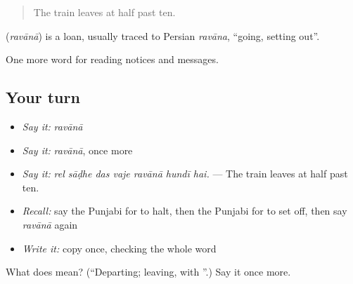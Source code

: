 \begin{quote}
The train leaves at half past ten.
\end{quote}

\begin{cousinweb}
\textbf{} (\emph{ravānā}) is a loan, usually traced to Persian \emph{ravāna}, \textquotedblleft{}going, setting out\textquotedblright{}.
\end{cousinweb}

\begin{grammarlens}[title={What you've built}]
One more word for reading notices and messages.
\end{grammarlens}

\subsection*{Your turn}
\begin{itemize}
\raggedright
  \item \emph{Say it:} \emph{ravānā}
  \item \emph{Say it:} \emph{ravānā}, once more
  \item \emph{Say it:} \emph{rel sāḍhe das vaje ravānā hundī hai.} — The train leaves at half past ten.
  \item \emph{Recall:} say the Punjabi for to halt, then the Punjabi for to set off, then say \emph{ravānā} again
  \item \emph{Write it:} copy \textbf{} once, checking the whole word
\end{itemize}

\begin{tcolorbox}[breakable,colback=teal!4,colframe=teal!35!black,title={Before you move on}]
What does  mean? (\textquotedblleft{}Departing; leaving, with \textquotedblright{}.) Say it once more.
\end{tcolorbox}
